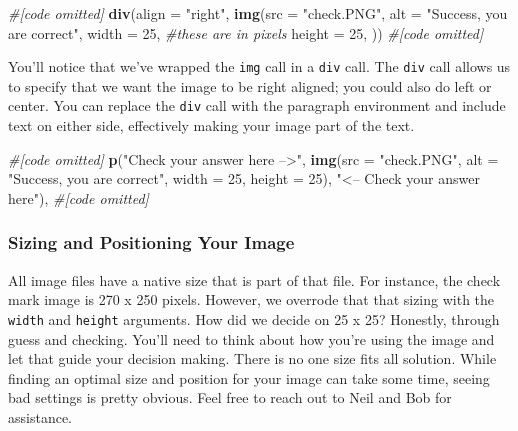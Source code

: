 \documentclass[
]{book}
\newenvironment{Shaded}{\begin{snugshade}}{\end{snugshade}}
\newcommand{\CommentTok}[1]{\textcolor[rgb]{0.56,0.35,0.01}{\textit{#1}}}
\newcommand{\DataTypeTok}[1]{\textcolor[rgb]{0.13,0.29,0.53}{#1}}
\newcommand{\DecValTok}[1]{\textcolor[rgb]{0.00,0.00,0.81}{#1}}
\newcommand{\KeywordTok}[1]{\textcolor[rgb]{0.13,0.29,0.53}{\textbf{#1}}}
\newcommand{\NormalTok}[1]{#1}
\newcommand{\StringTok}[1]{\textcolor[rgb]{0.31,0.60,0.02}{#1}}
\begin{document}
\begin{Shaded}
\begin{Highlighting}[]
\CommentTok{#[code omitted]}
\KeywordTok{div}\NormalTok{(}\DataTypeTok{align =} \StringTok{"right"}\NormalTok{,}
    \KeywordTok{img}\NormalTok{(}\DataTypeTok{src =} \StringTok{"check.PNG"}\NormalTok{,}
        \DataTypeTok{alt =} \StringTok{"Success, you are correct"}\NormalTok{,}
        \DataTypeTok{width =} \DecValTok{25}\NormalTok{, }\CommentTok{#these are in pixels}
        \DataTypeTok{height =} \DecValTok{25}\NormalTok{,}
\NormalTok{        ))}
\CommentTok{#[code omitted]}
\end{Highlighting}
\end{Shaded}

You'll notice that we've wrapped the \texttt{img} call in a \texttt{div} call. The \texttt{div} call allows us to specify that we want the image to be right aligned; you could also do left or center. You can replace the \texttt{div} call with the paragraph environment and include text on either side, effectively making your image part of the text.

\begin{Shaded}
\begin{Highlighting}[]
\CommentTok{#[code omitted]}
\KeywordTok{p}\NormalTok{(}\StringTok{"Check your answer here -->"}\NormalTok{,}
  \KeywordTok{img}\NormalTok{(}\DataTypeTok{src =} \StringTok{"check.PNG"}\NormalTok{,}
      \DataTypeTok{alt =} \StringTok{"Success, you are correct"}\NormalTok{,}
      \DataTypeTok{width =} \DecValTok{25}\NormalTok{, }\DataTypeTok{height =} \DecValTok{25}\NormalTok{),}
  \StringTok{"<-- Check your answer here"}\NormalTok{),}
\CommentTok{#[code omitted]}
\end{Highlighting}
\end{Shaded}

\hypertarget{sizing-and-positioning-your-image}{%
\subsubsection{Sizing and Positioning Your Image}\label{sizing-and-positioning-your-image}}

All image files have a native size that is part of that file. For instance, the check mark image is 270 x 250 pixels. However, we overrode that that sizing with the \texttt{width} and \texttt{height} arguments. How did we decide on 25 x 25? Honestly, through guess and checking. You'll need to think about how you're using the image and let that guide your decision making. There is no one size fits all solution. While finding an optimal size and position for your image can take some time, seeing bad settings is pretty obvious. Feel free to reach out to Neil and Bob for assistance.
\end{document}
